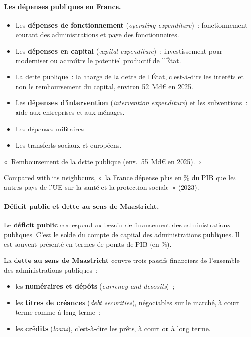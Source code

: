 \paragraph{Les dépenses publiques en France.}
\begin{itemize}
  \item Les \textbf{dépenses de fonctionnement} (\textit{operating
    expenditure})~: fonctionnement courant des administrations et paye des
    fonctionnaires.
  \item Les \textbf{dépenses en capital} (\textit{capital expenditure})~:
    investissement pour moderniser ou accroître le potentiel productif de l'État.
  \item La dette publique~: la charge de la dette de l'État, c'est-à-dire les
    intérêts et non le remboursement du capital, environ 52~Md€ en 2025.
  \item Les \textbf{dépenses d'intervention} (\textit{intervention expenditure})
    et les subventions~: aide aux entreprises et aux ménages.
  \item Les dépenses militaires.
  \item Les transferts sociaux et européens.
\end{itemize}

\begin{remark}
  «~Remboursement de la dette publique (env.\ 55~Md€ en 2025).~»
\end{remark}

Compared with its neighbours, «~la France dépense plus en \% du PIB que les
autres pays de l'UE sur la santé et la protection sociale~» (2023).

\paragraph{Déficit public et dette au sens de Maastricht.}

\begin{definition}
  Le \textbf{déficit public} correspond au besoin de financement des
  administrations publiques. C'est le solde du compte de capital des
  administrations publiques. Il est souvent présenté en termes de points de PIB
  (en \%).
\end{definition}

\begin{definition}
  La \textbf{dette au sens de Maastricht} couvre trois passifs financiers de
  l'ensemble des administrations publiques~:
  \begin{itemize}
    \item les \textbf{numéraires et dépôts} (\textit{currency and deposits})~;
    \item les \textbf{titres de créances} (\textit{debt securities}), négociables
      sur le marché, à court terme comme à long terme~;
    \item les \textbf{crédits} (\textit{loans}), c'est-à-dire les prêts, à court
      ou à long terme.
  \end{itemize}
\end{definition}

